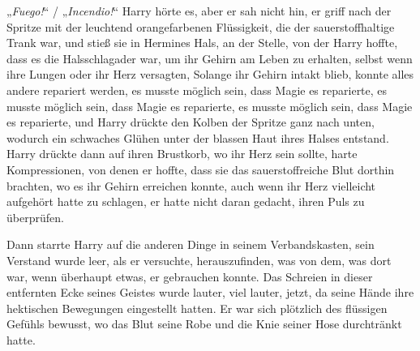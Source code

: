 „\emph{Fuego!}“ / „\emph{Incendio!}“ Harry hörte es, aber er sah nicht hin, er griff nach der Spritze mit der leuchtend orangefarbenen Flüssigkeit, die der sauerstoffhaltige Trank war, und stieß sie in Hermines Hals, an der Stelle, von der Harry hoffte, dass es die Halsschlagader war, um ihr Gehirn am Leben zu erhalten, selbst wenn ihre Lungen oder ihr Herz versagten, Solange ihr Gehirn intakt blieb, konnte alles andere repariert werden, es musste möglich sein, dass Magie es reparierte, es musste möglich sein, dass Magie es reparierte, es musste möglich sein, dass Magie es reparierte, und Harry drückte den Kolben der Spritze ganz nach unten, wodurch ein schwaches Glühen unter der blassen Haut ihres Halses entstand. Harry drückte dann auf ihren Brustkorb, wo ihr Herz sein sollte, harte Kompressionen, von denen er hoffte, dass sie das sauerstoffreiche Blut dorthin brachten, wo es ihr Gehirn erreichen konnte, auch wenn ihr Herz vielleicht aufgehört hatte zu schlagen, er hatte nicht daran gedacht, ihren Puls zu überprüfen.

Dann starrte Harry auf die anderen Dinge in seinem Verbandskasten, sein Verstand wurde leer, als er versuchte, herauszufinden, was von dem, was dort war, wenn überhaupt etwas, er gebrauchen konnte.
Das Schreien in dieser entfernten Ecke seines Geistes wurde lauter, viel lauter, jetzt, da seine Hände ihre hektischen Bewegungen eingestellt hatten. Er war sich plötzlich des flüssigen Gefühls bewusst, wo das Blut seine Robe und die Knie seiner Hose durchtränkt hatte.

